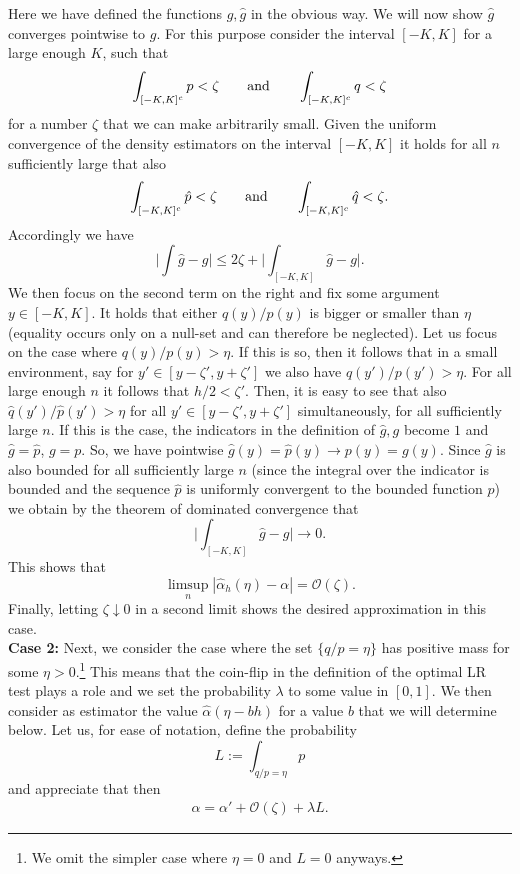 Here we have defined the functions $ g, \hat g$ in the obvious way. We will now show $\hat g$ converges pointwise to $g$. For this purpose consider the interval $[-K,K]$ for a large enough $K$, such that
\[
\int_{[-K,K]^c} p<\zeta \qquad \textnormal{and} \qquad\int_{[-K,K]^c} q<\zeta
\]
for a number $\zeta$ that we can make arbitrarily small. Given the uniform convergence of the density estimators on the interval $[-K,K]$ it holds for all $n$ sufficiently large that also
\[
\int_{[-K,K]^c} \hat p<\zeta \qquad \textnormal{and} \qquad\int_{[-K,K]^c} \hat q<\zeta.
\]
Accordingly we have 
 \[
 \bigg| \int \hat g - g\bigg| \le 2 \zeta + \bigg| \int_{[-K,K]} \hat g -g\bigg|.
 \]
 We then focus on the second term on the right and fix some argument $y \in [-K,K]$. It holds that either $ q(y)/ p(y)$ is bigger or smaller than $\eta$ (equality occurs only on a null-set and can therefore be neglected). Let us focus on the case where $q(y)/ p(y)> \eta$. If this is so, then it follows that in a small environment, say for $y' \in [y-\zeta', y+\zeta']$ we also have $q(y')/ p(y')>\eta$. For all large enough $n$ it follows that $h/2<\zeta'$. Then, it is easy to see that also $\hat q(y')/\hat p(y') >\eta$ for all $y' \in [y-\zeta', y+\zeta']$ simultaneously, for all sufficiently large $n$. If this is the case, the indicators in the definition of $\hat g, g$ become $1$ and $\hat g=\hat p$, $g=p$. 
 So, we have pointwise $\hat g(y)=\hat p(y)  \to p(y) =g(y)$. Since $\hat g$ is also bounded for all sufficiently large $n$ (since the integral over the indicator is bounded and the sequence $\hat p$ is uniformly convergent to the bounded function $p$) we obtain by the theorem of dominated convergence that 
 \[
 \bigg| \int_{[-K,K]} \hat g -g\bigg|\to 0.
 \]
 This shows that 
 \[
 \limsup_n|\hat \alpha_h(\eta) - \alpha|=\mathcal{O}(\zeta).
 \]
 Finally, letting $\zeta \downarrow 0$ in a second limit shows the desired approximation in this case.\\
 \textbf{Case 2:} Next, we consider the case where the set $\{q/p=\eta\}$ has positive mass for some $\eta>0$.\footnote{We omit the simpler case where $\eta=0$ and $L=0$ anyways.}
 This means that the coin-flip in the definition of the optimal LR test plays a role and we set the probability $\lambda $ to some value in $[0,1]$.
  We then consider as estimator the value $\hat \alpha(\eta-b h)$ for a value $b$ that we will determine below. Let us, for ease of notation, define the probability 
 \[
 L := \int_{q/p=\eta} p
 \]
and appreciate that then
\begin{align} \label{e:dec}
\alpha = \alpha'+\mathcal{O}(\zeta) + \lambda L.
\end{align}
